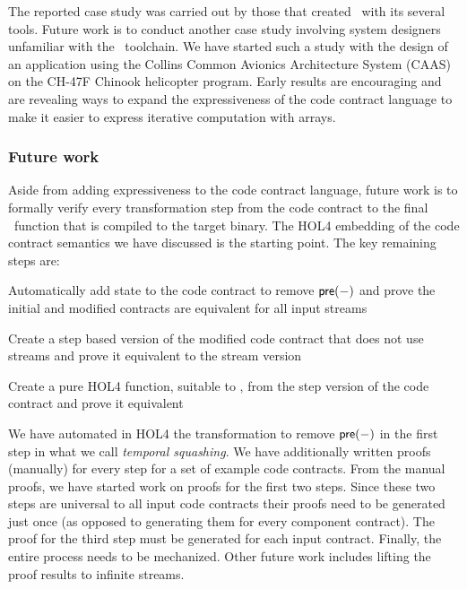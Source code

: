 The reported case study was carried out by those that created \brfcs\ with its several tools.
Future work is to conduct another case study involving system designers unfamiliar with the \brfcs\ toolchain.
We have started such a study with the design of
an application using the Collins Common Avionics Architecture System
(CAAS)~\cite{caas} on the CH-47F Chinook helicopter program.
Early results are encouraging and are revealing ways to expand the expressiveness of the code contract language to make it easier to express iterative computation with arrays.

\subsubsection*{Future work}

Aside from adding expressiveness to the code contract language, future
work is to formally verify every transformation step from the code
contract to the final \ckml\ function that is compiled to the target
binary.  The HOL4 embedding of the code contract semantics we have
discussed is the starting point.  The key remaining steps are:
\begin{compactitem}
  \item Automatically add state to the code contract to remove $\mathsf{pre}(-)$ and prove the initial and modified contracts are equivalent for all input streams
  \item Create a step based version of the modified code contract that does not use streams and prove it equivalent to the stream version
  \item Create a pure HOL4 function, suitable to \ckml, from the step version of the code contract and prove it equivalent
\end{compactitem}
We have automated in HOL4 the transformation to remove $\mathsf{pre}(-)$ in the first step in what we call \emph{temporal squashing}.
We have additionally written proofs (manually) for every step for a set of example code contracts.
From the manual proofs, we have started work on proofs for the first two steps.
Since these two steps are universal to all input code contracts their proofs need to be generated just once (as opposed to generating them for every component contract).
The proof for the third step must be generated for each input
contract. Finally, the entire process needs to be mechanized.  Other
future work includes lifting the proof results to infinite streams.
